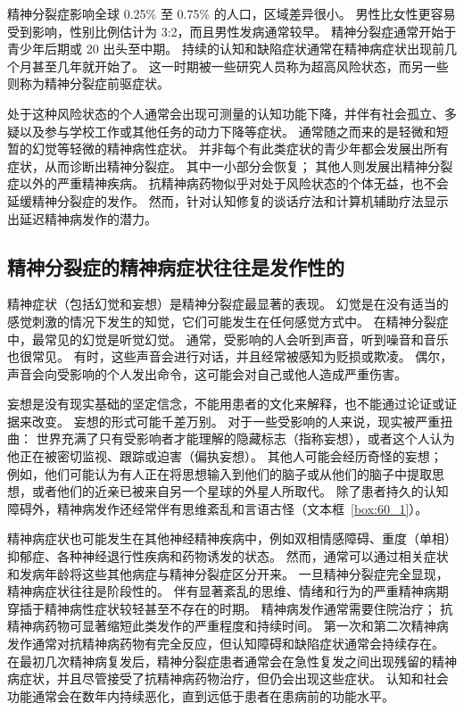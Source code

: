 精神分裂症影响全球 0.25\% 至 0.75\% 的人口，区域差异很小。
男性比女性更容易受到影响，性别比例估计为 3:2，而且男性发病通常较早。
精神分裂症通常开始于青少年后期或 20 出头至中期。
持续的认知和缺陷症状通常在精神病症状出现前几个月甚至几年就开始了。
这一时期被一些研究人员称为超高风险状态，而另一些则称为精神分裂症前驱症状。


处于这种风险状态的个人通常会出现可测量的认知功能下降，并伴有社会孤立、多疑以及参与学校工作或其他任务的动力下降等症状。
通常随之而来的是轻微和短暂的幻觉等轻微的精神病性症状。
并非每个有此类症状的青少年都会发展出所有症状，从而诊断出精神分裂症。
其中一小部分会恢复；
其他人则发展出精神分裂症以外的严重精神疾病。
抗精神病药物似乎对处于风险状态的个体无益，也不会延缓精神分裂症的发作。
然而，针对认知修复的谈话疗法和计算机辅助疗法显示出延迟精神病发作的潜力。



\subsection{精神分裂症的精神病症状往往是发作性的}

精神症状（包括幻觉和妄想）是精神分裂症最显著的表现。
幻觉是在没有适当的感觉刺激的情况下发生的知觉，它们可能发生在任何感觉方式中。
在精神分裂症中，最常见的幻觉是听觉幻觉。
通常，受影响的人会听到声音，听到噪音和音乐也很常见。
有时，这些声音会进行对话，并且经常被感知为贬损或欺凌。
偶尔，声音会向受影响的个人发出命令，这可能会对自己或他人造成严重伤害。


妄想是没有现实基础的坚定信念，不能用患者的文化来解释，也不能通过论证或证据来改变。
妄想的形式可能千差万别。
对于一些受影响的人来说，现实被严重扭曲：
世界充满了只有受影响者才能理解的隐藏标志（指称妄想），或者这个人认为他正在被密切监视、跟踪或迫害（偏执妄想）。
其他人可能会经历奇怪的妄想；
例如，他们可能认为有人正在将思想输入到他们的脑子或从他们的脑子中提取思想，或者他们的近亲已被来自另一个星球的外星人所取代。
除了患者持久的认知障碍外，精神病发作还经常伴有思维紊乱和言语古怪（文本框~\ref{box:60_1}）。


精神病症状也可能发生在其他神经精神疾病中，例如双相情感障碍、重度（单相）抑郁症、各种神经退行性疾病和药物诱发的状态。
然而，通常可以通过相关症状和发病年龄将这些其他病症与精神分裂症区分开来。
一旦精神分裂症完全显现，精神病症状往往是阶段性的。
伴有显著紊乱的思维、情绪和行为的严重精神病期穿插于精神病性症状较轻甚至不存在的时期。
精神病发作通常需要住院治疗；
抗精神病药物可显著缩短此类发作的严重程度和持续时间。
第一次和第二次精神病发作通常对抗精神病药物有完全反应，但认知障碍和缺陷症状通常会持续存在。
在最初几次精神病复发后，精神分裂症患者通常会在急性复发之间出现残留的精神病症状，并且尽管接受了抗精神病药物治疗，但仍会出现这些症状。
认知和社会功能通常会在数年内持续恶化，直到远低于患者在患病前的功能水平。



